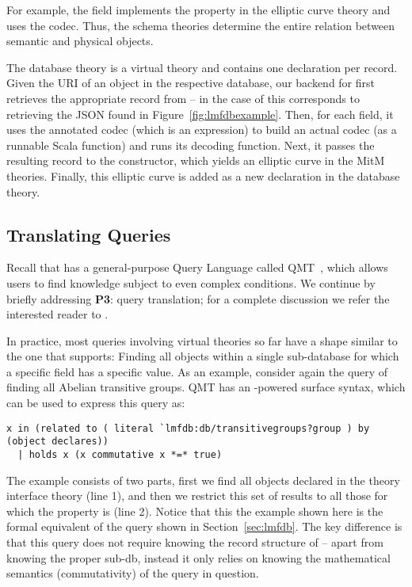 For example, the  field implements the  property in the elliptic curve theory and uses the  codec.
Thus, the schema theories determine the entire relation between semantic and physical objects.

The database theory is a virtual theory and contains one declaration per \lmfdb record.
Given the URI of an object in the respective database, our \mmt backend for \lmfdb first retrieves the appropriate record from {\lmfdb} -- in the case of  this corresponds to retrieving the JSON found in Figure~\ref{fig:lmfdbexample}. 
Then, for each field, it uses the annotated codec (which is an \ommt expression) to build an actual codec (as a runnable Scala function) and runs its decoding function.
Next, it passes the resulting record to the  constructor, which yields an elliptic curve in the MitM theories.
Finally, this elliptic curve is added as a new declaration in the database theory.

\subsection{Translating Queries}\label{sec:qmt}

 Recall that \mmt has a general-purpose Query Language called QMT~\cite{Rabe:qlfml12}, which allows users to find knowledge subject to even complex conditions. 
We continue by briefly addressing \textbf{P3}: query translation; for a complete discussion we refer the interested reader to \cite{twiesing:msc17}. 

In practice, most queries involving virtual theories so far have a shape similar to the one that \lmfdb supports: 
Finding all objects within a single sub-database for which a specific field has a specific value. 
As an example, consider again the query of finding all Abelian transitive groups. 
QMT has an \mmt-powered surface syntax, which can be used to express this query as:
\begin{lstlisting}[language=qmt,basicstyle=\small\sf]
x in (related to ( literal `lmfdb:db/transitivegroups?group ) by (object declares)) 
  | holds x (x commutative x *=* true)
\end{lstlisting}

The example consists of two parts, first we find all objects declared in the theory
interface theory  (line 1), and then we restrict this set of results to all those for which the  property is  (line 2). 
Notice that this the example shown here is the formal equivalent of the \lmfdb query shown in Section~\ref{sec:lmfdb}. 
The key difference is that this query does not require knowing the record structure of \lmfdb --
apart from knowing the proper sub-db, instead it only relies on knowing the mathematical
semantics (commutativity) of the query in question. 

